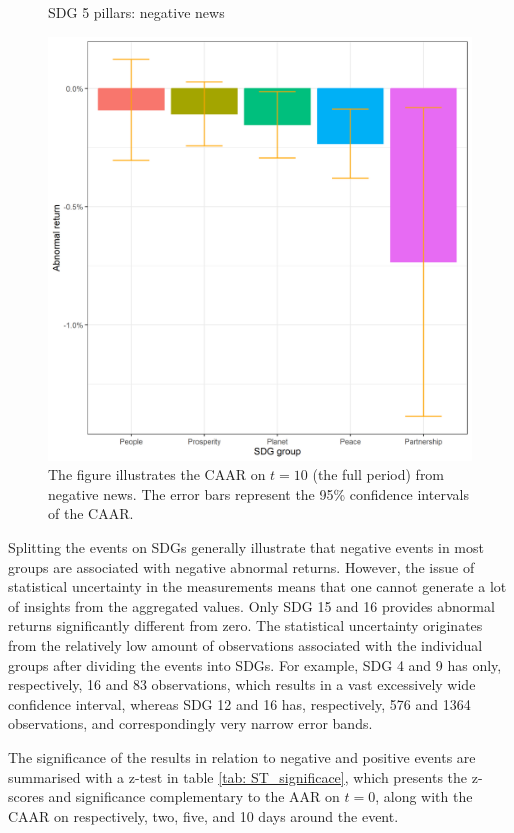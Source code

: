 \begin{figure} [H]
    \centering
    \caption{SDG 5 pillars: negative news}
    \includegraphics[scale=0.6]{Projekt/1.Figures analysis/ST_negative_sdg_bar_groups_0.png}
    \caption*{\footnotesize The figure illustrates the CAAR on $t = 10$ (the full period) from negative news. The error bars represent the 95\% confidence intervals of the CAAR.}
    \label{fig:ST_neg_bar}
\end{figure}

Splitting the events on SDGs generally illustrate that negative events in most groups are associated with negative abnormal returns. However, the issue of statistical uncertainty in the measurements means that one cannot generate a lot of insights from the aggregated values. Only SDG 15 and 16 provides abnormal returns significantly different from zero. The statistical uncertainty originates from the relatively low amount of observations associated with the individual groups after dividing the events into SDGs. For example, SDG 4 and 9 has only, respectively, 16 and 83 observations, which results in a vast excessively wide confidence interval, whereas SDG 12 and 16 has, respectively, 576 and 1364 observations, and correspondingly very narrow error bands. 

The significance of the results in relation to negative and positive events are summarised with a z-test in table \ref{tab: ST_significace}, which presents the z-scores and significance complementary to the AAR on $t=0$, along with the CAAR on respectively, two, five, and 10 days around the event.  



